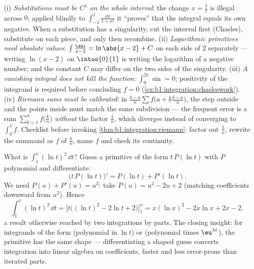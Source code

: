 \begin{remark}
(i) \emph{Substitutions must be $C^1$ on the whole interval}:
the change $x = \frac1t$ is illegal across $0$; applied blindly
to $\int_{-1}^{1}\frac{\dd x}{1 + x^2}$ it ``proves'' that the
integral equals its own negative. When a substitution has a
singularity, cut the interval first (Chasles), substitute on
each piece, and only then recombine. (ii) \emph{Logarithmic
primitives need absolute values}: $\int \frac{\dd x}{x - 2} =
\ln\abs{x - 2} + C$ on each side of $2$ separately --- writing
$\ln(x - 2)$ on $\intoo{0}{1}$ is writing the logarithm of a
negative number; and the constant $C$ may differ on the two
sides of the singularity. (iii) \emph{A vanishing integral does
not kill the function}: $\int_0^{2\pi}\sin = 0$; positivity of
the integrand is required before concluding $f = 0$
(\cref{ex:b1:integration:chasleswork}). (iv) \emph{Riemann sums
must be calibrated}: in $\frac{b-a}{n}\sum f\bigl(a +
k\frac{b-a}{n}\bigr)$, the step outside and the points inside
must match the same subdivision --- the frequent error is a sum
$\sum_{k=1}^{n} f\bigl(\frac kn\bigr)$ \emph{without} the factor
$\frac1n$, which diverges instead of converging to $\int_0^1
f$. Checklist before invoking \cref{thm:b1:integration:riemann}:
factor out $\frac1n$, rewrite the summand as $f$ of $\frac kn$,
name $f$ and check its continuity.
\end{remark}

\begin{example}\label{ex:b1:integration:guessdiff}
What is $\int_1^x (\ln t)^2\,\dd t$? Guess a primitive of the
form $t\,P(\ln t)$ with $P$ polynomial and differentiate:
\[
\bigl(t\,P(\ln t)\bigr)' = P(\ln t) + P'(\ln t) .
\]
We need $P(u) + P'(u) = u^2$: take $P(u) = u^2 - 2u + 2$
(matching coefficients downward from $u^2$). Hence
\[
\int_1^x (\ln t)^2\,\dd t
= \bigl[t\bigl((\ln t)^2 - 2\ln t + 2\bigr)\bigr]_1^x
= x(\ln x)^2 - 2x\ln x + 2x - 2 ,
\]
a result otherwise reached by two integrations by parts. The
closing insight: for integrands of the form
(polynomial in $\ln t$) or (polynomial times $\eu^{\lambda t}$),
the primitive has the same shape --- differentiating a shaped
guess converts integration into linear algebra on coefficients,
faster and less error-prone than iterated parts.
\end{example}

